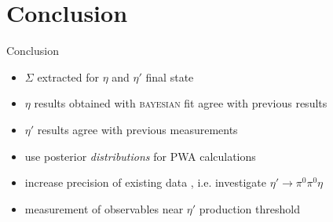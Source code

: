 \documentclass[11pt,aspectratio=169,dvipsnames]{beamer}
\newcommand{\thecolor}{black!70!blue}
\begin{document}
	\section{Conclusion}
	\begin{frame}{Conclusion}
		\begin{minipage}{.49\linewidth}
			\begin{tcolorbox}[colback=blue!5,colframe=\thecolor,title={Summary}]
				\begin{itemize}
					\item $\Sigma$ extracted for $\eta$ and $\eta'$ final state
					\item $\eta$ results obtained with \textsc{bayesian} fit agree with previous results 
					\item $\eta'$ results agree with previous measurements
				\end{itemize}
			\end{tcolorbox}
		\end{minipage}
		\begin{minipage}{.49\linewidth}
			\begin{tcolorbox}[colback=blue!5,colframe=\thecolor,title={Outlook}]
				\begin{itemize}
					
					\item use posterior \emph{distributions} for PWA calculations
					\item increase precision of existing data , i.e. investigate $\eta'\to\pi^0\pi^0\eta$
					\item measurement of observables near $\eta'$ production threshold
					
				\end{itemize}
			\end{tcolorbox}
		\end{minipage}
	\end{frame}
	
\end{document}
